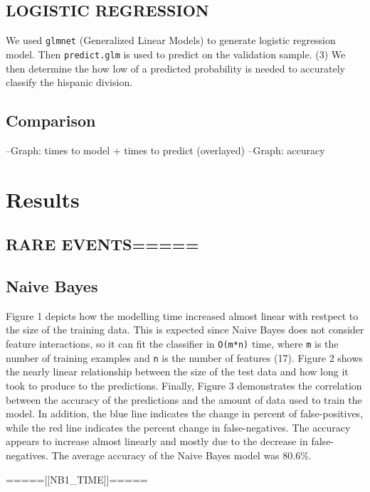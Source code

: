 \documentclass[a4paper]{article}
\begin{document}
\begin{multicols}{2}
\subsection*{LOGISTIC REGRESSION}
We used \texttt{glmnet} (Generalized Linear Models) to generate logistic regression model.
Then \texttt{predict.glm} is used to predict on the validation sample.
(3) We then determine the how low of a predicted probability is needed to accurately classify the hispanic division.
\subsection*{Comparison}
--Graph: times to model + times to predict (overlayed)
--Graph: accuracy

\section*{Results}
\subsection*{RARE EVENTS=====}




\subsection*{Naive Bayes}
Figure 1 depicts how the modelling time increased almost linear with restpect to the size of the training data. This is expected since Naive Bayes does not consider feature interactions, so it can fit the classifier in \texttt{O(m*n)} time, where \texttt{m} is the number of training examples and \texttt{n} is the number of features (17). Figure 2 shows the nearly linear relationship between the size of the test data and how long it took to produce to the predictions. Finally, Figure 3 demonstrates the correlation between the accuracy of the predictions and the amount of data used to train the model. In addition, the blue line indicates the change in percent of false-positives, while the red line indicates the percent change in false-negatives. The accuracy appears to increase almost linearly and mostly due to the decrease in false-negatives. The average accuracy of the Naive Bayes model was 80.6\%. 
\begin{Schunk}
\end{Schunk}
\begin{center}
=====[[NB1\_TIME]]=====


\end{center}
\end{multicols}
\end{document}
